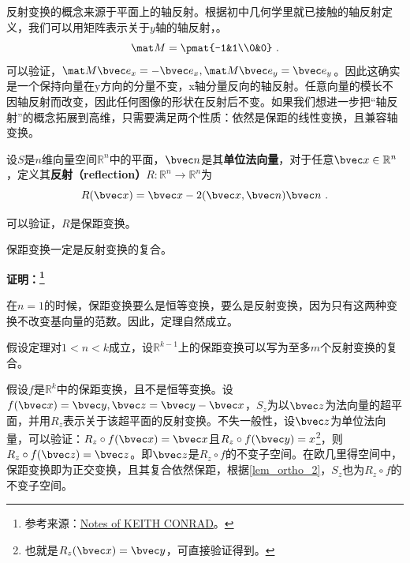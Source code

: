 
\begin{issues}
\issueMissDepend
\end{issues}

反射变换的概念来源于平面上的轴反射。根据初中几何学里就已接触的轴反射定义，我们可以用矩阵表示关于$y$轴的轴反射，。
\begin{equation}
\mat M=\pmat{-1&1\\0&0}~.
\end{equation}
可以验证，$\mat M\bvec e_x=-\bvec e_x,\mat M \bvec e_y=\bvec e_y$。因此这确实是一个保持向量在y方向的分量不变，x轴分量反向的轴反射。任意向量的模长不因轴反射而改变，因此任何图像的形状在反射后不变。如果我们想进一步把“轴反射”的概念拓展到高维，只需要满足两个性质：依然是保距的线性变换，且兼容轴变换。




\begin{definition}{}
设$S$是$n$维向量空间$\mathbb R^n$中的平面，$\bvec n$是其\textbf{单位法向量}，对于任意$\bvec x\in \mathbb R^n$，定义其\textbf{反射（reflection）}$R:\mathbb R^n\rightarrow \mathbb R^n$为
\begin{equation}
R(\bvec x)=\bvec x-2(\bvec x,\bvec n)\bvec n~.
\end{equation}
\end{definition}
可以验证，$R$是保距变换。


\begin{theorem}{}
保距变换一定是反射变换的复合。
\end{theorem}
\textbf{证明：\footnote{参考来源：\href{https://kconrad.math.uconn.edu/blurbs/grouptheory/isometryRn.pdf}{Notes of KEITH CONRAD}。}}

在$n=1$的时候，保距变换要么是恒等变换，要么是反射变换，因为只有这两种变换不改变基向量的范数。因此，定理自然成立。

假设定理对$1<n<k$成立，设$\mathbb R^{k-1}$上的保距变换可以写为至多$m$个反射变换的复合。 

假设$f$是$\mathbb R^k$中的保距变换，且不是恒等变换。设$f(\bvec x)=\bvec y,\bvec z=\bvec y-\bvec x$，$S_z$为以$\bvec z$为法向量的超平面，并用$R_z$表示关于该超平面的反射变换。不失一般性，设$\bvec z$为单位法向量，可以验证：$R_z\circ f(\bvec x)=\bvec x$且$R_z\circ f(\bvec y)=x$\footnote{也就是$R_z(\bvec x)=\bvec y$，可直接验证得到。}，则$R_z\circ f(\bvec z)=\bvec z$。即$\bvec z$是$R_z\circ f$的不变子空间。在欧几里得空间中，保距变换即为正交变换，且其复合依然保距，根据\autoref{lem_ortho_2}，$S_z$也为$R_z\circ f$的不变子空间。

